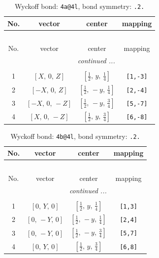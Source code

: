 \documentclass[fleqn,8pt]{jsarticle}
\begin{document}
\begin{longtable}{cccc}
\caption{Wyckoff bond: {\tt 4a@4l}, bond symmetry: {\tt .2.}}
 \\
 \hline \hline
No. & vector & center & mapping \\ \hline \endfirsthead

\multicolumn{3}{l}{\tablename\ \thetable{}} \\
 \hline \hline
No. & vector & center & mapping \\ \hline \endhead

 \hline \hline
\multicolumn{3}{r}{\footnotesize\it continued ...} \\ \endfoot

 \hline \hline
\multicolumn{3}{r}{} \\ \endlastfoot

1 & $\left[ X,\, 0,\, Z \right]$ & $\left[ \frac{1}{2},\, y,\, \frac{1}{4} \right]$ & {\tt [1,-3]} \\ \hline
2 & $\left[ - X,\, 0,\, Z \right]$ & $\left[ \frac{1}{2},\, - y,\, \frac{1}{4} \right]$ & {\tt [2,-4]} \\ \hline
3 & $\left[ - X,\, 0,\, - Z \right]$ & $\left[ \frac{1}{2},\, - y,\, \frac{3}{4} \right]$ & {\tt [5,-7]} \\ \hline
4 & $\left[ X,\, 0,\, - Z \right]$ & $\left[ \frac{1}{2},\, y,\, \frac{3}{4} \right]$ & {\tt [6,-8]} \\
\end{longtable}
\renewcommand{\arraystretch}{1.2}
\begin{longtable}{cccc}
\caption{Wyckoff bond: {\tt 4b@4l}, bond symmetry: {\tt .2.}}
 \\
 \hline \hline
No. & vector & center & mapping \\ \hline \endfirsthead

\multicolumn{3}{l}{\tablename\ \thetable{}} \\
 \hline \hline
No. & vector & center & mapping \\ \hline \endhead

 \hline \hline
\multicolumn{3}{r}{\footnotesize\it continued ...} \\ \endfoot

 \hline \hline
\multicolumn{3}{r}{} \\ \endlastfoot

1 & $\left[ 0,\, Y,\, 0 \right]$ & $\left[ \frac{1}{2},\, y,\, \frac{1}{4} \right]$ & {\tt [1,3]} \\ \hline
2 & $\left[ 0,\, - Y,\, 0 \right]$ & $\left[ \frac{1}{2},\, - y,\, \frac{1}{4} \right]$ & {\tt [2,4]} \\ \hline
3 & $\left[ 0,\, - Y,\, 0 \right]$ & $\left[ \frac{1}{2},\, - y,\, \frac{3}{4} \right]$ & {\tt [5,7]} \\ \hline
4 & $\left[ 0,\, Y,\, 0 \right]$ & $\left[ \frac{1}{2},\, y,\, \frac{3}{4} \right]$ & {\tt [6,8]} \\
\end{longtable}
\end{document}
